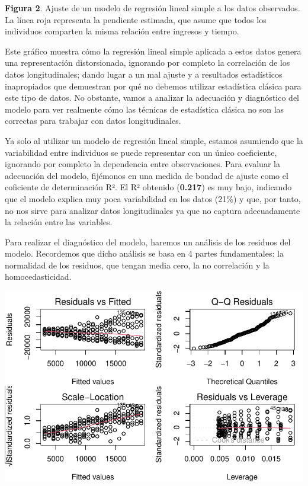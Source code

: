 \documentclass[
  letterpaper,
  DIV=11,
  numbers=noendperiod]{scrreprt}
\begin{document}
\textbf{Figura 2}. Ajuste de un modelo de regresión lineal simple a los
datos observados. La línea roja representa la pendiente estimada, que
asume que todos los individuos comparten la misma relación entre
ingresos y tiempo.

Este gráfico muestra cómo la regresión lineal simple aplicada a estos
datos genera una representación distorsionada, ignorando por completo la
correlación de los datos longitudinales; dando lugar a un mal ajuste y a
resultados estadísticos inapropiados que demuestran por qué no debemos
utilizar estadística clásica para este tipo de datos. No obstante, vamos
a analizar la adecuación y diagnóstico del modelo para ver realmente
cómo las técnicas de estadística clásica no son las correctas para
trabajar con datos longitudinales.

Ya solo al utilizar un modelo de regresión lineal simple, estamos
asumiendo que la variabilidad entre individuos se puede representar con
un único coeficiente, ignorando por completo la dependencia entre
observaciones. Para evaluar la adecuación del modelo, fijémonos en una
medida de bondad de ajuste como el coficiente de determinación R². El R²
obtenido (\textbf{0.217}) es muy bajo, indicando que el modelo explica
muy poca variabilidad en los datos (21\%) y que, por tanto, no nos sirve
para analizar datos longitudinales ya que no captura adecuadamente la
relación entre las variables.

Para realizar el diagnóstico del modelo, haremos un análisis de los
residuos del modelo. Recordemos que dicho análisis se basa en 4 partes
fundamentales: la normalidad de los residuos, que tengan media cero, la
no correlación y la homocedasticidad.

\includegraphics{cap2_files/figure-pdf/unnamed-chunk-5-1.pdf}
\end{document}
